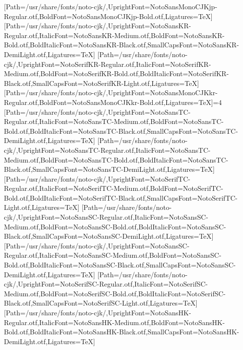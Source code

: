 \newfontfamily{}[Path=/usr/share/fonts/noto-cjk/,UprightFont=NotoSansMonoCJKjp-Regular.otf,BoldFont=NotoSansMonoCJKjp-Bold.otf,Ligatures=TeX]
\newfontfamily{}[Path=/usr/share/fonts/noto-cjk/,UprightFont=NotoSansKR-Regular.otf,ItalicFont=NotoSansKR-Medium.otf,BoldFont=NotoSansKR-Bold.otf,BoldItalicFont=NotoSansKR-Black.otf,SmallCapsFont=NotoSansKR-DemiLight.otf,Ligatures=TeX]
\newfontfamily{}[Path=/usr/share/fonts/noto-cjk/,UprightFont=NotoSerifKR-Regular.otf,ItalicFont=NotoSerifKR-Medium.otf,BoldFont=NotoSerifKR-Bold.otf,BoldItalicFont=NotoSerifKR-Black.otf,SmallCapsFont=NotoSerifKR-Light.otf,Ligatures=TeX]
\newfontfamily{}[Path=/usr/share/fonts/noto-cjk/,UprightFont=NotoSansMonoCJKkr-Regular.otf,BoldFont=NotoSansMonoCJKkr-Bold.otf,Ligatures=TeX]\else\ifnum\value{NotoCJKFamily}=4
\newfontfamily{}[Path=/usr/share/fonts/noto-cjk/,UprightFont=NotoSansTC-Regular.otf,ItalicFont=NotoSansTC-Medium.otf,BoldFont=NotoSansTC-Bold.otf,BoldItalicFont=NotoSansTC-Black.otf,SmallCapsFont=NotoSansTC-DemiLight.otf,Ligatures=TeX]
\newfontfamily{}[Path=/usr/share/fonts/noto-cjk/,UprightFont=NotoSansTC-Regular.otf,ItalicFont=NotoSansTC-Medium.otf,BoldFont=NotoSansTC-Bold.otf,BoldItalicFont=NotoSansTC-Black.otf,SmallCapsFont=NotoSansTC-DemiLight.otf,Ligatures=TeX]
\newfontfamily{}[Path=/usr/share/fonts/noto-cjk/,UprightFont=NotoSerifTC-Regular.otf,ItalicFont=NotoSerifTC-Medium.otf,BoldFont=NotoSerifTC-Bold.otf,BoldItalicFont=NotoSerifTC-Black.otf,SmallCapsFont=NotoSerifTC-Light.otf,Ligatures=TeX]
\newfontfamily{}[Path=/usr/share/fonts/noto-cjk/,UprightFont=NotoSansSC-Regular.otf,ItalicFont=NotoSansSC-Medium.otf,BoldFont=NotoSansSC-Bold.otf,BoldItalicFont=NotoSansSC-Black.otf,SmallCapsFont=NotoSansSC-DemiLight.otf,Ligatures=TeX]
\newfontfamily{}[Path=/usr/share/fonts/noto-cjk/,UprightFont=NotoSansSC-Regular.otf,ItalicFont=NotoSansSC-Medium.otf,BoldFont=NotoSansSC-Bold.otf,BoldItalicFont=NotoSansSC-Black.otf,SmallCapsFont=NotoSansSC-DemiLight.otf,Ligatures=TeX]
\newfontfamily{}[Path=/usr/share/fonts/noto-cjk/,UprightFont=NotoSerifSC-Regular.otf,ItalicFont=NotoSerifSC-Medium.otf,BoldFont=NotoSerifSC-Bold.otf,BoldItalicFont=NotoSerifSC-Black.otf,SmallCapsFont=NotoSerifSC-Light.otf,Ligatures=TeX]
\newfontfamily{}[Path=/usr/share/fonts/noto-cjk/,UprightFont=NotoSansHK-Regular.otf,ItalicFont=NotoSansHK-Medium.otf,BoldFont=NotoSansHK-Bold.otf,BoldItalicFont=NotoSansHK-Black.otf,SmallCapsFont=NotoSansHK-DemiLight.otf,Ligatures=TeX]
